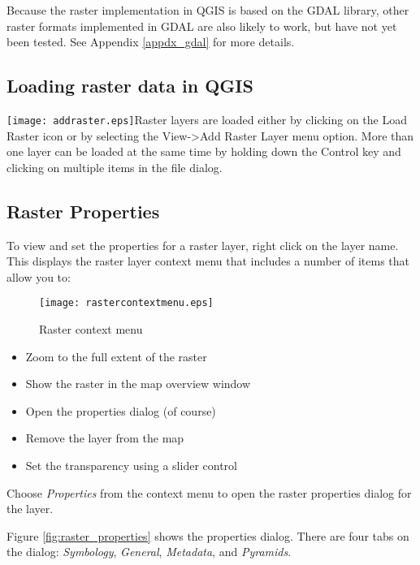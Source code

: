 Because the raster implementation in QGIS is based on the GDAL library, other
raster formats implemented in GDAL are also likely to work, but have not yet
been tested. See Appendix \ref{appdx_gdal} for more
details.
	
\subsection{Loading raster data in QGIS}\label{label_loadraster}

\texttt{[image: addraster.eps]}Raster layers
are loaded either by clicking on the Load Raster icon or by selecting the
View->Add Raster Layer menu option. More than one layer can be loaded at the
same time by holding down the Control key and clicking on multiple items in
the file dialog.
	
\subsection{Raster Properties}\label{label_rasterprop}

To view and set the properties for a raster layer, right click on the layer
name. This displays the raster layer context menu that includes a number of
items that allow you to:

\begin{figure}[ht]
   \begin{center}
   \caption{Raster context menu}\label{fig:raster_contextmenu}\smallskip
   \texttt{[image: rastercontextmenu.eps]}
\end{center}  
\end{figure}

\begin{itemize}
\item Zoom to the full extent of the raster
\item Show the raster in the map overview window
\item Open the properties dialog (of course)
\item Remove the layer from the map
\item Set the transparency using a slider control
\end{itemize}

Choose \textsl{Properties} from the context menu to open the raster properties
dialog for the layer.

Figure \ref{fig:raster_properties} shows the properties dialog. There are four
tabs on the dialog: \textsl{Symbology}, \textsl{General}, \textsl{Metadata},
and \textsl{Pyramids}.

